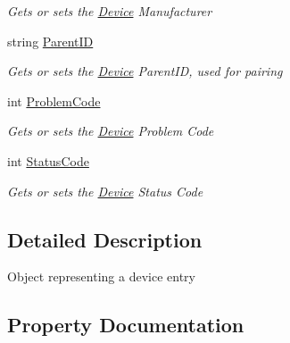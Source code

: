 \begin{DoxyCompactItemize}
\begin{DoxyCompactList}\small\item\em Gets or sets the \hyperlink{class_microsoft_1_1_tools_1_1_windows_device_portal_1_1_device_portal_1_1_device}{Device} Manufacturer \end{DoxyCompactList}\item 
string \hyperlink{class_microsoft_1_1_tools_1_1_windows_device_portal_1_1_device_portal_1_1_device_a7e0bf4bc507fae55dd0f829f3cf12e3f}{Parent\+ID}
\begin{DoxyCompactList}\small\item\em Gets or sets the \hyperlink{class_microsoft_1_1_tools_1_1_windows_device_portal_1_1_device_portal_1_1_device}{Device} Parent\+ID, used for pairing \end{DoxyCompactList}\item 
int \hyperlink{class_microsoft_1_1_tools_1_1_windows_device_portal_1_1_device_portal_1_1_device_a11d9ee51375f9d3781ba700dbb6b6d8b}{Problem\+Code}
\begin{DoxyCompactList}\small\item\em Gets or sets the \hyperlink{class_microsoft_1_1_tools_1_1_windows_device_portal_1_1_device_portal_1_1_device}{Device} Problem Code \end{DoxyCompactList}\item 
int \hyperlink{class_microsoft_1_1_tools_1_1_windows_device_portal_1_1_device_portal_1_1_device_a2cb8da8bf2c4631922d76fab5b6ad29e}{Status\+Code}
\begin{DoxyCompactList}\small\item\em Gets or sets the \hyperlink{class_microsoft_1_1_tools_1_1_windows_device_portal_1_1_device_portal_1_1_device}{Device} Status Code \end{DoxyCompactList}\end{DoxyCompactItemize}


\subsection{Detailed Description}
Object representing a device entry 



\subsection{Property Documentation}
